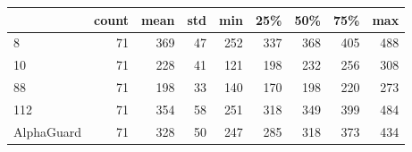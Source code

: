 \begin{tabular}{lrrrrrrrr}
\toprule
{} &  count &  mean &  std &  min &  25\% &  50\% &  75\% &  max \\
\midrule
8          &     71 &   369 &   47 &  252 &  337 &  368 &  405 &  488 \\
10         &     71 &   228 &   41 &  121 &  198 &  232 &  256 &  308 \\
88         &     71 &   198 &   33 &  140 &  170 &  198 &  220 &  273 \\
112        &     71 &   354 &   58 &  251 &  318 &  349 &  399 &  484 \\
AlphaGuard &     71 &   328 &   50 &  247 &  285 &  318 &  373 &  434 \\
\bottomrule
\end{tabular}

